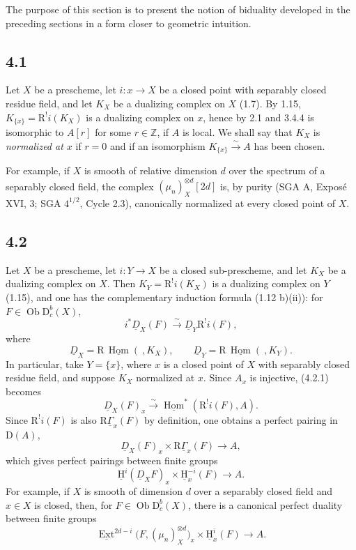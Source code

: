 \documentclass[12pt]{article}
\newcommand{\ZZ}{\mathbb Z}
\newcommand{\Hom}{\operatorname{Hom}}
\newcommand{\Ext}{\operatorname{Ext}}
\newcommand{\ob}{\operatorname{Ob}}
\newcommand{\D}{\mathrm D}
\newcommand{\R}{\mathrm R}
\newcommand{\uH}{\underline{\mathrm H}}
\newcommand{\uExt}{\underline{\Ext}}
\begin{document}
The purpose of this section is to present the notion of biduality developed in the preceding sections in a form closer to geometric intuition.

\subsection*{4.1}
Let $X$ be a prescheme, let $i:x\to X$ be a closed point with separably closed residue field, and let $K_X$ be a dualizing complex on $X$ (1.7). By 1.15, $K_{\{x\}}=\R^!i(K_X)$ is a dualizing complex on $x$, hence by 2.1 and 3.4.4 is isomorphic to $A[r]$ for some $r\in\ZZ$, if $A$ is local. We shall say that $K_X$ is \emph{normalized at $x$} if $r=0$ and if an isomorphism $K_{\{x\}}\xrightarrow{\sim}A$ has been chosen.

For example, if $X$ is smooth of relative dimension $d$ over the spectrum of a separably closed field, the complex $(\mu_n)_X^{\otimes d}[2d]$ is, by purity (SGA A, Exposé XVI, 3; SGA $4^{1/2}$, Cycle 2.3), canonically normalized at every closed point of $X$.

\subsection*{4.2}
Let $X$ be a prescheme, let $i:Y\to X$ be a closed sub-prescheme, and let $K_X$ be a dualizing complex on $X$. Then $K_Y=\R^!i(K_X)$ is a dualizing complex on $Y$ (1.15), and one has the complementary induction formula (1.12 b)(ii)): for $F\in\ob\D_c^b(X)$,
\[
   i^*\underline D_X(F)\xrightarrow{\sim}\underline D_Y\R^!i(F),\tag{4.2.1}
\]
where
\[
   \underline D_X=\R\,\underline{\Hom}(\ ,K_X),\qquad
   \underline D_Y=\R\,\underline{\Hom}(\ ,K_Y).
\]
In particular, take $Y=\{x\}$, where $x$ is a closed point of $X$ with separably closed residue field, and suppose $K_X$ normalized at $x$. Since $A_x$ is injective, (4.2.1) becomes
\[
   \underline D_X(F)_x\xrightarrow{\sim}\underline{\Hom}^*(\R^!i(F),A).\tag{4.2.2}
\]
Since $\R^!i(F)$ is also $\R\underline\Gamma_x(F)$ by definition, one obtains a perfect pairing in $\D(A)$,
\[
   \underline D_X(F)_x\times \R\underline\Gamma_x(F)\longrightarrow A,\tag{4.2.2'}
\]
which gives perfect pairings between finite groups
\[
   \uH^i(\underline D_XF)_x\times \uH^{-i}_x(F)\longrightarrow A.\tag{4.2.2''}
\]
For example, if $X$ is smooth of dimension $d$ over a separably closed field and $x\in X$ is closed, then, for $F\in\ob\D_c^b(X)$, there is a canonical perfect duality between finite groups
\[
   \uExt^{2d-i}\bigl(F,(\mu_n)_X^{\otimes d}\bigr)_x
      \times \uH^i_x(F)\longrightarrow A.\tag{4.2.2'''}
\]
\end{document}
